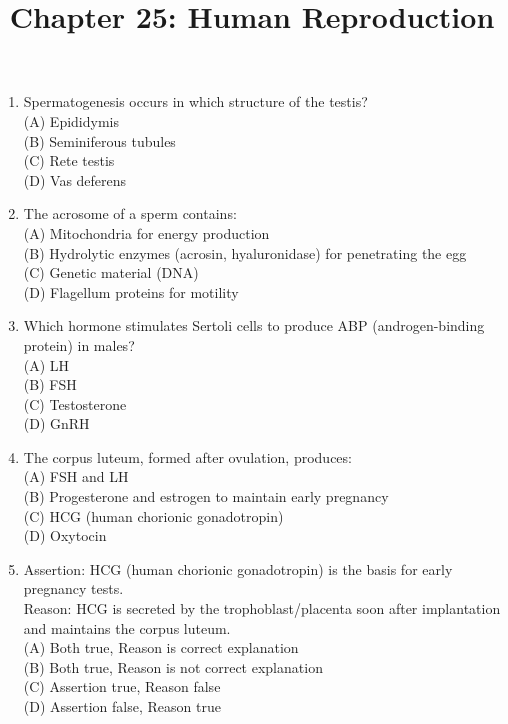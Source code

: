 \documentclass{article}
\begin{document}
\title{Chapter 25: Human Reproduction}
\date{}
\maketitle

\begin{enumerate}[label=Q\arabic*.]

\item Spermatogenesis occurs in which structure of the testis?
\\(A) Epididymis
\\(B) Seminiferous tubules
\\(C) Rete testis
\\(D) Vas deferens

\item The acrosome of a sperm contains:
\\(A) Mitochondria for energy production
\\(B) Hydrolytic enzymes (acrosin, hyaluronidase) for penetrating the egg
\\(C) Genetic material (DNA)
\\(D) Flagellum proteins for motility

\item Which hormone stimulates Sertoli cells to produce ABP (androgen-binding protein) in males?
\\(A) LH
\\(B) FSH
\\(C) Testosterone
\\(D) GnRH

\item The corpus luteum, formed after ovulation, produces:
\\(A) FSH and LH
\\(B) Progesterone and estrogen to maintain early pregnancy
\\(C) HCG (human chorionic gonadotropin)
\\(D) Oxytocin

\item Assertion: HCG (human chorionic gonadotropin) is the basis for early pregnancy tests.\\
Reason: HCG is secreted by the trophoblast/placenta soon after implantation and maintains the corpus luteum.
\\(A) Both true, Reason is correct explanation
\\(B) Both true, Reason is not correct explanation
\\(C) Assertion true, Reason false
\\(D) Assertion false, Reason true


\end{enumerate}
\end{document}
